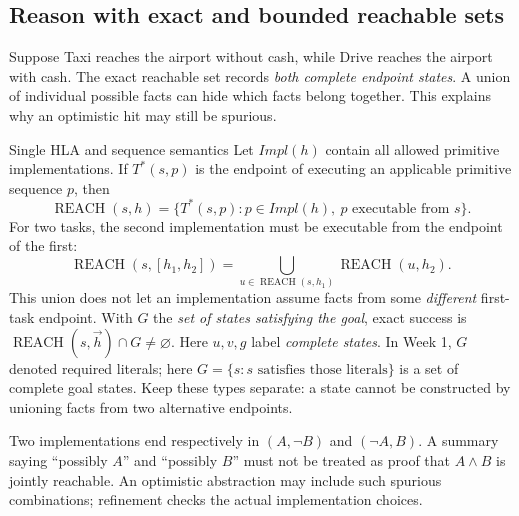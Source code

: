 \documentclass[10pt,a4paper]{article}
\newcommand{\Reach}{\operatorname{REACH}}
\begin{document}
\subsection{Reason with exact and bounded reachable sets}
\begin{idea}
Suppose Taxi reaches the airport without cash, while Drive reaches the airport with cash. The exact reachable set records \emph{both complete endpoint states}. A union of individual possible facts can hide which facts belong together. This explains why an optimistic hit may still be spurious.
\end{idea}

\begin{card}{Single HLA and sequence semantics}
Let $Impl(h)$ contain all allowed primitive implementations. If $T^*(s,p)$ is the endpoint of executing an applicable primitive sequence $p$, then
\[
\Reach(s,h)=\{T^*(s,p):p\in Impl(h),\ p\text{ executable from }s\}.
\]
For two tasks, the second implementation must be executable from the endpoint of the first:
\[
\Reach(s,[h_1,h_2])=\bigcup_{u\in\Reach(s,h_1)}\Reach(u,h_2).
\]
This union does not let an implementation assume facts from some \emph{different} first-task endpoint. With $G$ the \emph{set of states satisfying the goal}, exact success is $\Reach(s,\vec h)\cap G\ne\varnothing$.
Here $u,v,g$ label \emph{complete states}. In Week 1, $G$ denoted required literals; here $G=\{s:s\text{ satisfies those literals}\}$ is a set of complete goal states. Keep these types separate: a state cannot be constructed by unioning facts from two alternative endpoints.
\end{card}

\begin{note}
Two implementations end respectively in $(A,\neg B)$ and $(\neg A,B)$. A summary saying ``possibly $A$'' and ``possibly $B$'' must not be treated as proof that $A\land B$ is jointly reachable. An optimistic abstraction may include such spurious combinations; refinement checks the actual implementation choices.
\end{note}
\end{document}
